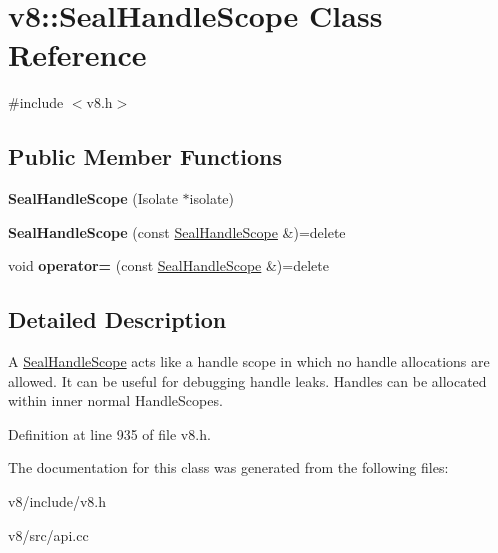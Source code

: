 \hypertarget{classv8_1_1SealHandleScope}{}\section{v8\+:\+:Seal\+Handle\+Scope Class Reference}
\label{classv8_1_1SealHandleScope}


{\ttfamily \#include $<$v8.\+h$>$}

\subsection*{Public Member Functions}
\begin{DoxyCompactItemize}
\item 
\mbox{\label{classv8_1_1SealHandleScope_acfdab75cc53b53d3ba1a50ab5f4fe16e}} 
{\bfseries Seal\+Handle\+Scope} (Isolate $\ast$isolate)
\item 
\mbox{\label{classv8_1_1SealHandleScope_a5e1f6e49a9aa67bb570437fa98097e75}} 
{\bfseries Seal\+Handle\+Scope} (const \mbox{\hyperlink{classv8_1_1SealHandleScope}{Seal\+Handle\+Scope}} \&)=delete
\item 
\mbox{\label{classv8_1_1SealHandleScope_a61b69e50f3996e315c4d3f41c1f67956}} 
void {\bfseries operator=} (const \mbox{\hyperlink{classv8_1_1SealHandleScope}{Seal\+Handle\+Scope}} \&)=delete
\end{DoxyCompactItemize}


\subsection{Detailed Description}
A \mbox{\hyperlink{classv8_1_1SealHandleScope}{Seal\+Handle\+Scope}} acts like a handle scope in which no handle allocations are allowed. It can be useful for debugging handle leaks. Handles can be allocated within inner normal Handle\+Scopes. 

Definition at line 935 of file v8.\+h.



The documentation for this class was generated from the following files\+:\begin{DoxyCompactItemize}
\item 
v8/include/v8.\+h\item 
v8/src/api.\+cc\end{DoxyCompactItemize}
